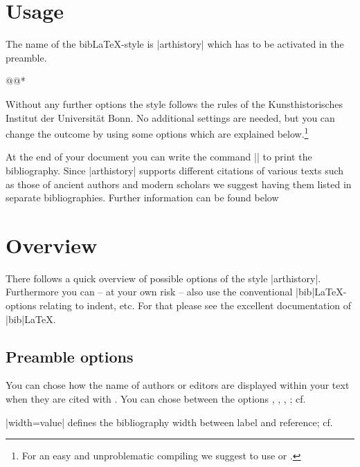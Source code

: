 \documentclass[a4paper,
10pt,
ngerman,
english
]{ltxdoc}
\begin{document}
\section{Usage}
   The name of the bib\LaTeX-style is  |arthistory| which has to be activated in the preamble. 

\begin{code}
\usepackage[style=arthistory,%
          *@@*]{biblatex}
@@*
\end{code}

Without any further options the style follows the rules of the Kunsthistorisches Institut der Universität Bonn.
No additional settings are needed,
but you can change the outcome by using some options which are explained below.\footnote{For an easy and unproblematic compiling we suggest to use  or  .}

At the end of your document you can write the command |\printbibliography| to print 
the bibliography. 
Since |arthistory| supports different citations of various texts such as those of ancient authors and  modern scholars we suggest  having them listed in separate bibliographies. 
Further information can be found below %

\section{Overview}\label{overview}
There follows a quick overview of possible options of the style |arthistory|. 
Furthermore you can -- at your own risk -- also use the conventional |bib|\LaTeX-options relating to indent, etc. 
For that please see the excellent documentation of  |bib|\LaTeX.

\subsection{Preamble options}\label{preamble_options}

You can chose how the name of authors or editors are displayed within your text when they are cited with .
You can chose between the options , , , ; 
cf. %

|width={value}| defines the bibliography width between label and reference; cf. %
\end{document}
